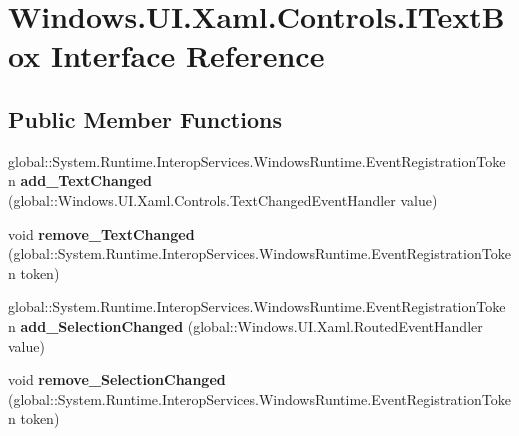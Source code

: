 \hypertarget{interface_windows_1_1_u_i_1_1_xaml_1_1_controls_1_1_i_text_box}{}\section{Windows.\+U\+I.\+Xaml.\+Controls.\+I\+Text\+Box Interface Reference}
\label{interface_windows_1_1_u_i_1_1_xaml_1_1_controls_1_1_i_text_box}
\subsection*{Public Member Functions}
\begin{DoxyCompactItemize}
\item 
\mbox{\label{interface_windows_1_1_u_i_1_1_xaml_1_1_controls_1_1_i_text_box_adfbfa844057a8d451f7ce00ca1632498}} 
global\+::\+System.\+Runtime.\+Interop\+Services.\+Windows\+Runtime.\+Event\+Registration\+Token {\bfseries add\+\_\+\+Text\+Changed} (global\+::\+Windows.\+U\+I.\+Xaml.\+Controls.\+Text\+Changed\+Event\+Handler value)
\item 
\mbox{\label{interface_windows_1_1_u_i_1_1_xaml_1_1_controls_1_1_i_text_box_a32cd181527e79d8b2154c89ea0984dea}} 
void {\bfseries remove\+\_\+\+Text\+Changed} (global\+::\+System.\+Runtime.\+Interop\+Services.\+Windows\+Runtime.\+Event\+Registration\+Token token)
\item 
\mbox{\label{interface_windows_1_1_u_i_1_1_xaml_1_1_controls_1_1_i_text_box_a981d451491963f006453c0c0b14a8fda}} 
global\+::\+System.\+Runtime.\+Interop\+Services.\+Windows\+Runtime.\+Event\+Registration\+Token {\bfseries add\+\_\+\+Selection\+Changed} (global\+::\+Windows.\+U\+I.\+Xaml.\+Routed\+Event\+Handler value)
\item 
\mbox{\label{interface_windows_1_1_u_i_1_1_xaml_1_1_controls_1_1_i_text_box_a3cb1d0fb9f12435f1a1ccee943050023}} 
void {\bfseries remove\+\_\+\+Selection\+Changed} (global\+::\+System.\+Runtime.\+Interop\+Services.\+Windows\+Runtime.\+Event\+Registration\+Token token)
\item 

\end{DoxyCompactItemize}
